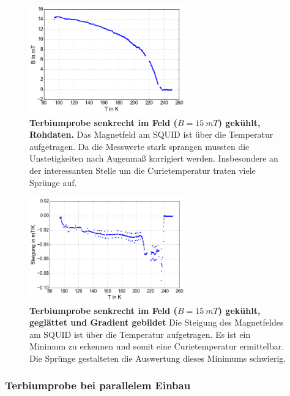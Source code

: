 \documentclass[a4paper,ngerman]{scrartcl}
\begin{document}
\begin{figure}
\centering
\includegraphics[width=0.6\textwidth]{abbildungen/Tb_sr_150.png}
\caption[Terbiumprobe senkrecht bei 15mT]{\textbf{Terbiumprobe senkrecht im Feld ($B = \SI{15}{mT}$) gekühlt, Rohdaten.} 
Das Magnetfeld am SQUID ist über die Temperatur aufgetragen. 
Da die Messwerte stark sprangen mussten die Unstetigkeiten nach Augenmaß korrigiert werden.
Insbesondere an der interessanten Stelle um die Curietemperatur traten viele Sprünge auf.}
\label{fig:Tb_sr_15}
\end{figure}




\begin{figure}
\centering
\includegraphics[width=0.6\textwidth]{abbildungen/Tb_sr_150_grad.png}
\caption[Terbiumprobe senkrecht bei Nullfeld]{\textbf{Terbiumprobe senkrecht im Feld ($B = \SI{15}{mT}$) gekühlt, geglättet und Gradient gebildet} 
Die Steigung des Magnetfeldes am SQUID ist über die Temperatur aufgetragen. 
Es ist ein Minimum zu erkennen und somit eine Curietemperatur ermittelbar.
Die Sprünge gestalteten die Auswertung dieses Minimums schwierig.}
\label{fig:Tb_sr_15_grad}
\end{figure}


\subsubsection{Terbiumprobe bei parallelem Einbau}
\end{document}
